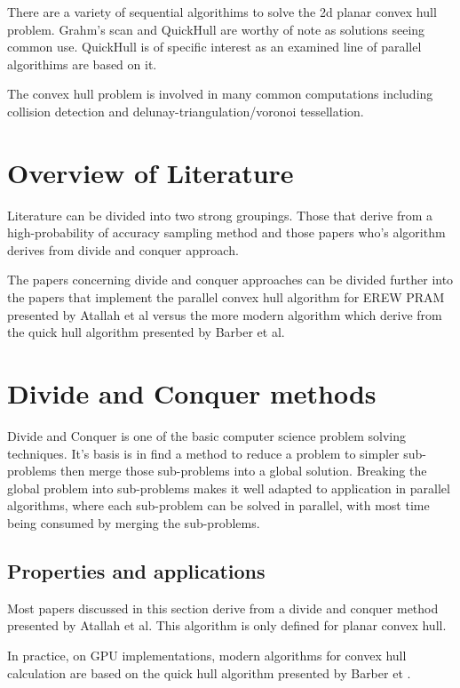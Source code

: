 \documentclass[10pt,a4paper]{report}
\begin{document}
There are a variety of sequential algorithims to solve the 2d planar convex hull problem. Grahm's scan\cite{graham1972efficient} and QuickHull\cite{Barber1996} are worthy of note as solutions seeing common use. QuickHull is of specific interest as an examined line of parallel algorithims are based on it\cite{Stein2012CudaHull}\cite{SrikanthFast}.

The convex hull problem is involved in many common computations including collision detection and delunay-triangulation/voronoi tessellation.




\section{Overview of Literature}

Literature can be divided into two strong groupings. Those that derive from a high-probability of accuracy sampling method and those papers who's algorithm derives from divide and conquer approach.

The papers concerning divide and conquer approaches can be divided further into the papers that implement the parallel convex hull algorithm for EREW PRAM presented by Atallah et al versus the more modern algorithm which derive from the quick hull algorithm presented by Barber et al.


\section{Divide and Conquer methods}

Divide and Conquer is one of the basic computer science problem solving techniques. It's basis is in find a method to reduce a problem to simpler sub-problems then merge those sub-problems into a global solution. Breaking the global problem into sub-problems makes it well adapted to application in parallel algorithms, where each sub-problem can be solved in parallel, with most time being consumed by merging the sub-problems.


\subsection{Properties and applications}

Most papers discussed in this section derive from a divide and conquer method presented by Atallah et al\cite{Atallah1986Efficient}.
This algorithm is only defined for planar convex hull.

In practice, on GPU implementations, modern algorithms for convex hull calculation are based on the quick hull algorithm presented by Barber et .
\end{document}
